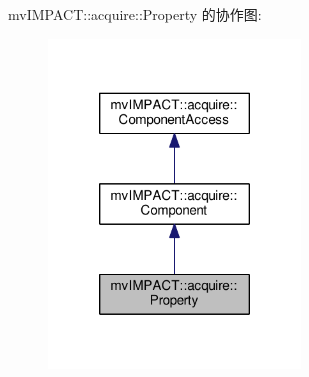 mv\+I\+M\+P\+A\+C\+T\+:\+:acquire\+:\+:Property 的协作图\+:
\nopagebreak
\begin{figure}[H]
\begin{center}
\leavevmode
\includegraphics[width=190pt]{classmv_i_m_p_a_c_t_1_1acquire_1_1_property__coll__graph}
\end{center}
\end{figure}
